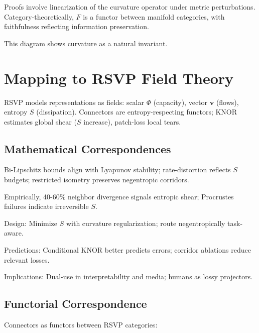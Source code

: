 \documentclass{article}
\theoremstyle{definition}
\begin{document}
Proofs involve linearization of the curvature operator under metric perturbations. Category-theoretically, $F$ is a functor between manifold categories, with faithfulness reflecting information preservation.


This diagram shows curvature as a natural invariant.

\section{Mapping to RSVP Field Theory}

RSVP models representations as fields: scalar $\Phi$ (capacity), vector $\mathbf{v}$ (flows), entropy $S$ (dissipation). Connectors are entropy-respecting functors; KNOR estimates global shear ($S$ increase), patch-loss local tears.

\subsection{Mathematical Correspondences}

Bi-Lipschitz bounds align with Lyapunov stability; rate-distortion reflects $S$ budgets; restricted isometry preserves negentropic corridors.

Empirically, 40-60\% neighbor divergence signals entropic shear; Procrustes failures indicate irreversible $S$.

Design: Minimize $S$ with curvature regularization; route negentropically task-aware.

Predictions: Conditional KNOR better predicts errors; corridor ablations reduce relevant losses.

Implications: Dual-use in interpretability and media; humans as lossy projectors.

\subsection{Functorial Correspondence}

Connectors as functors between RSVP categories:

\end{document}
